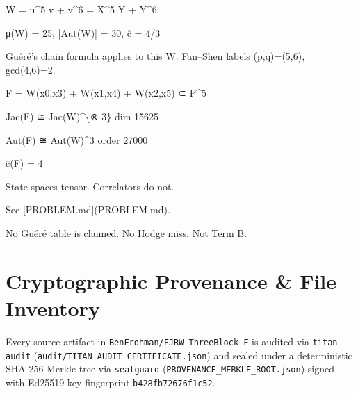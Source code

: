\documentclass[11pt,a4paper]{article}
\begin{document}
W = u\textasciicircum{}5 v + v\textasciicircum{}6 = X\textasciicircum{}5 Y + Y\textasciicircum{}6

μ(W) = 25,   |Aut(W)| = 30,   ĉ = 4/3

Guéré's chain formula applies to this W. Fan–Shen labels (p,q)=(5,6), gcd(4,6)=2.

F = W(x0,x3) + W(x1,x4) + W(x2,x5)  ⊂ P\textasciicircum{}5

Jac(F) ≅ Jac(W)\textasciicircum{}\{⊗ 3\}     dim 15625

Aut(F) ≅ Aut(W)\textasciicircum{}3          order 27000

ĉ(F) = 4

State spaces tensor. Correlators do not.

See [PROBLEM.md](PROBLEM.md).

No Guéré table is claimed. No Hodge miss. Not Term B.

\section{Cryptographic Provenance \& File Inventory}
Every source artifact in \texttt{BenFrohman/FJRW-ThreeBlock-F} is audited via \texttt{titan-audit}
(\texttt{audit/TITAN\_AUDIT\_CERTIFICATE.json}) and sealed under a deterministic SHA-256 Merkle tree via
\texttt{sealguard} (\texttt{PROVENANCE\_MERKLE\_ROOT.json}) signed with Ed25519 key fingerprint
\texttt{b428fb72676f1c52}.
\end{document}
